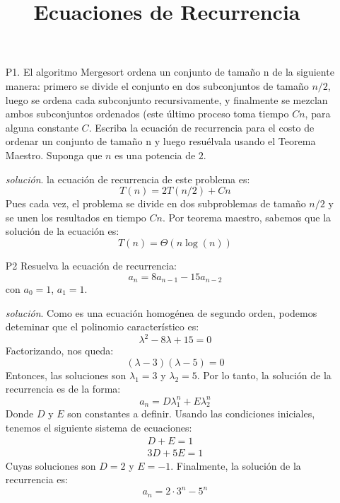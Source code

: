 \documentclass[dcc]{fcfmcourse}
\title{Ecuaciones de Recurrencia}
\begin{document}
\maketitle

\vspace{-1ex}

\begin{itemize}
\item[P1.] El algoritmo Mergesort ordena un conjunto de tamaño n de la siguiente manera: primero se divide el conjunto en dos subconjuntos de tamaño $n/2$, luego se ordena cada subconjunto recursivamente, y finalmente se mezclan ambos subconjuntos ordenados (este último proceso toma tiempo $Cn$, para alguna constante $C$. Escriba la ecuación de recurrencia para el costo de ordenar un conjunto de tamaño n y luego resuélvala usando el Teorema Maestro. Suponga que $n$ es una potencia de $2$.

\item[\textit{solución}.] la ecuación de recurrencia de este problema es:
\begin{equation}
T(n) = 2T(n/2) + Cn
\end{equation}
Pues cada vez, el problema se divide en dos subproblemas de tamaño $n/2$ y se unen los resultados en tiempo $Cn$.
Por teorema maestro, sabemos que la solución de la ecuación es:
\begin{equation}
T(n) = \Theta(n\log(n))
\end{equation}

\item[P2] Resuelva la ecuación de recurrencia:
\begin{equation}
a_n = 8a_{n −1} − 15a_{n −2}
\end{equation}
con $a_0 = 1$, $a_1 = 1$.

\item[\textit{solución}.] Como es una ecuación homogénea de segundo orden, podemos deteminar que el polinomio característico es:
\begin{equation}
\lambda^2 - 8\lambda + 15 = 0
\end{equation}
Factorizando, nos queda:
\begin{equation}
(\lambda - 3)(\lambda - 5) = 0
\end{equation}
Entonces, las soluciones son $\lambda_1 = 3$ y $\lambda_2 = 5$. Por lo tanto, la solución de la recurrencia es de la forma:
\begin{equation}
a_n = D\lambda_1^n + E\lambda_2^n
\end{equation}
Donde $D$ y $E$ son constantes a definir. Usando las condiciones iniciales, tenemos el siguiente sistema de ecuaciones:
\begin{align*}
D + E = 1\\
3D + 5E = 1
\end{align*}
Cuyas soluciones son $D = 2$ y $E = -1$. Finalmente, la solución de la recurrencia es:
\begin{equation}
a_n = 2\cdot 3^n - 5^n
\end{equation}


\end{itemize}
\end{document}
